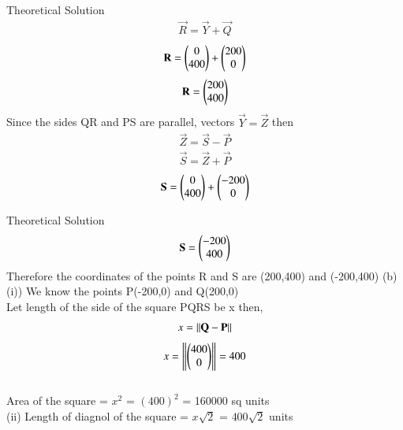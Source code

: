 \documentclass{beamer}
\begin{document}
    \begin{frame}{Theoretical Solution}
        \begin{align}
                \vec{R}=\vec{Y}+\vec{Q}
            \end{align}
            \begin{align}
                \mathbf{R}=\begin{pmatrix}0\\400\end{pmatrix}+\begin{pmatrix}200\\0\end{pmatrix}
            \end{align}
            \begin{align}
                \mathbf{R}=\begin{pmatrix}200\\400\end{pmatrix}
            \end{align}
            Since the sides QR and PS are parallel, vectors $\vec{Y}=\vec{Z}$ then
            \begin{align}
                \vec{Z}=\vec{S}-\vec{P}
            \end{align}
            \begin{align}
                \vec{S}=\vec{Z}+\vec{P}
            \end{align}
            \begin{align}
                \mathbf{S}=\begin{pmatrix}0\\400\end{pmatrix}+\begin{pmatrix}-200\\0\end{pmatrix}
            \end{align}
    \end{frame}
    \begin{frame}{Theoretical Solution}
        \begin{align}
                \mathbf{S}=\begin{pmatrix}-200\\400\end{pmatrix}
            \end{align}
            Therefore the coordinates of the points R and S are (200,400) and (-200,400)
            (b)\\
                (i)) We know the points P(-200,0) and Q(200,0)\\
                   Let length of the side of the square PQRS be x then,
                   \begin{align}
                       x=\left\lVert\mathbf{Q}-\mathbf{P}\right\rVert
                   \end{align}
                   \begin{align}
                       x=\left\lVert\begin{pmatrix}400\\0\end{pmatrix}\right\rVert=400
                   \end{align}\\
                Area of the square = $x^2$ = $(400)^2$ = 160000 sq units\\
                
                (ii) Length of diagnol of the square = $x\sqrt{2}$ = $400\sqrt{2}$ units\\
    \end{frame}
\end{document}
